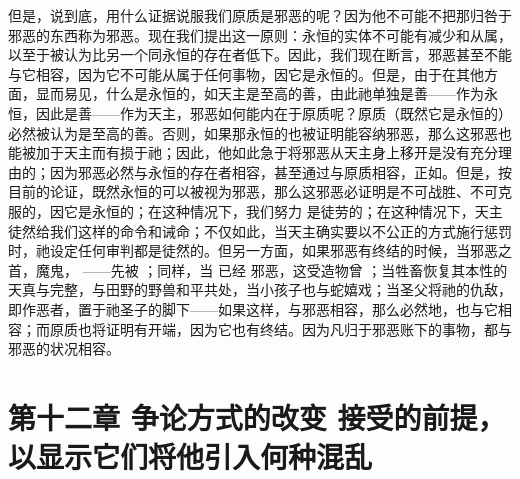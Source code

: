 但是，说到底，用什么证据说服我们原质是邪恶的呢？因为他不可能不把那归咎于邪恶的东西称为邪恶。现在我们提出这一原则：永恒的实体不可能有减少和从属，以至于被认为比另一个同永恒的存在者低下。因此，我们现在断言，邪恶甚至不能与它相容，因为它不可能从属于任何事物，因它是永恒的。但是，由于在其他方面，显而易见，什么是永恒的，如天主是至高的善，由此祂单独是善——作为永恒，因此是善——作为天主，邪恶如何能内在于原质呢？原质（既然它是永恒的）必然被认为是至高的善。否则，如果那永恒的也被证明能容纳邪恶，那么这邪恶也能被加于天主而有损于祂；因此，他如此急于将邪恶从天主身上移开是没有充分理由的；因为邪恶必然与永恒的存在者相容，甚至通过与原质相容，正如。但是，按目前的论证，既然永恒的可以被视为邪恶，那么这邪恶必证明是不可战胜、不可克服的，因它是永恒的；在这种情况下，我们努力 是徒劳的；在这种情况下，天主徒然给我们这样的命令和诫命；不仅如此，当天主确实要以不公正的方式施行惩罚时，祂设定任何审判都是徒然的。但另一方面，如果邪恶有终结的时候，当邪恶之首，魔鬼， ——先被 ；同样，当 已经 邪恶，这受造物曾 ；当牲畜恢复其本性的天真与完整，与田野的野兽和平共处，当小孩子也与蛇嬉戏；当圣父将祂的仇敌，即作恶者，置于祂圣子的脚下——如果这样，与邪恶相容，那么必然地，也与它相容；而原质也将证明有开端，因为它也有终结。因为凡归于邪恶账下的事物，都与邪恶的状况相容。\par


\section{第十二章  争论方式的改变  接受的前提，以显示它们将他引入何种混乱}

